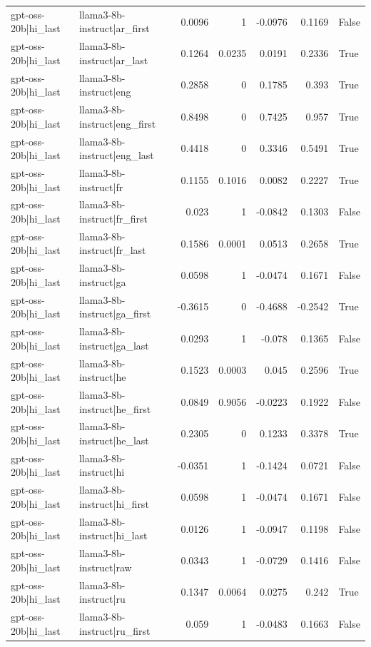 \begin{table}
\begin{tabular}{l l r r r r l}
gpt-oss-20b|hi_last & llama3-8b-instruct|ar_first & 0.0096 & 1 & -0.0976 & 0.1169 & False \\
gpt-oss-20b|hi_last & llama3-8b-instruct|ar_last & 0.1264 & 0.0235 & 0.0191 & 0.2336 & True \\
gpt-oss-20b|hi_last & llama3-8b-instruct|eng & 0.2858 & 0 & 0.1785 & 0.393 & True \\
gpt-oss-20b|hi_last & llama3-8b-instruct|eng_first & 0.8498 & 0 & 0.7425 & 0.957 & True \\
gpt-oss-20b|hi_last & llama3-8b-instruct|eng_last & 0.4418 & 0 & 0.3346 & 0.5491 & True \\
gpt-oss-20b|hi_last & llama3-8b-instruct|fr & 0.1155 & 0.1016 & 0.0082 & 0.2227 & True \\
gpt-oss-20b|hi_last & llama3-8b-instruct|fr_first & 0.023 & 1 & -0.0842 & 0.1303 & False \\
gpt-oss-20b|hi_last & llama3-8b-instruct|fr_last & 0.1586 & 0.0001 & 0.0513 & 0.2658 & True \\
gpt-oss-20b|hi_last & llama3-8b-instruct|ga & 0.0598 & 1 & -0.0474 & 0.1671 & False \\
gpt-oss-20b|hi_last & llama3-8b-instruct|ga_first & -0.3615 & 0 & -0.4688 & -0.2542 & True \\
gpt-oss-20b|hi_last & llama3-8b-instruct|ga_last & 0.0293 & 1 & -0.078 & 0.1365 & False \\
gpt-oss-20b|hi_last & llama3-8b-instruct|he & 0.1523 & 0.0003 & 0.045 & 0.2596 & True \\
gpt-oss-20b|hi_last & llama3-8b-instruct|he_first & 0.0849 & 0.9056 & -0.0223 & 0.1922 & False \\
gpt-oss-20b|hi_last & llama3-8b-instruct|he_last & 0.2305 & 0 & 0.1233 & 0.3378 & True \\
gpt-oss-20b|hi_last & llama3-8b-instruct|hi & -0.0351 & 1 & -0.1424 & 0.0721 & False \\
gpt-oss-20b|hi_last & llama3-8b-instruct|hi_first & 0.0598 & 1 & -0.0474 & 0.1671 & False \\
gpt-oss-20b|hi_last & llama3-8b-instruct|hi_last & 0.0126 & 1 & -0.0947 & 0.1198 & False \\
gpt-oss-20b|hi_last & llama3-8b-instruct|raw & 0.0343 & 1 & -0.0729 & 0.1416 & False \\
gpt-oss-20b|hi_last & llama3-8b-instruct|ru & 0.1347 & 0.0064 & 0.0275 & 0.242 & True \\
gpt-oss-20b|hi_last & llama3-8b-instruct|ru_first & 0.059 & 1 & -0.0483 & 0.1663 & False \\

\end{tabular}
\end{table}
